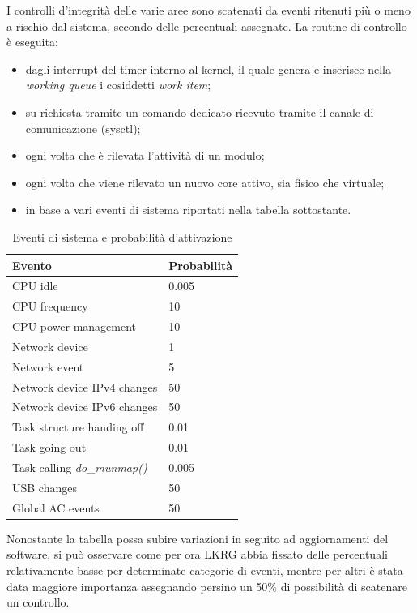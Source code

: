 I controlli d'integrità delle varie aree sono scatenati da eventi ritenuti più o meno a rischio dal sistema, secondo delle percentuali assegnate. La routine di controllo è eseguita:

\begin{itemize}
\item dagli interrupt del timer interno al kernel, il quale genera e inserisce nella \emph{working queue} i cosiddetti \emph{work item};
\item su richiesta tramite un comando dedicato ricevuto tramite il canale di comunicazione (sysctl);
\item ogni volta che è rilevata l'attività di un modulo;
\item ogni volta che viene rilevato un nuovo core attivo, sia fisico che virtuale;
\item in base a vari eventi di sistema riportati nella tabella sottostante.
\end{itemize}

\clearpage

\begin{table}[!htbp]
\label{tab:sysevents}
\centering
\begin{tabular}{|l|l|}
\hline
\textbf{Evento} & \textbf{Probabilità}\\
\hline
CPU idle & 0.005 \\
CPU frequency & 10 \\ 
CPU power management & 10 \\ 
Network device & 1 \\ 
Network event & 5 \\ 
Network device IPv4 changes & 50 \\ 
Network device IPv6 changes & 50 \\
Task structure handing off & 0.01 \\
Task going out & 0.01 \\
Task calling \emph{do\_munmap()} & 0.005 \\ [1ex] 
USB changes & 50 \\ 
Global AC events & 50 \\ 
\hline
\end{tabular}
\caption{Eventi di sistema e probabilità d'attivazione}
\end{table}

Nonostante la tabella possa subire variazioni in seguito ad aggiornamenti del software, si può osservare come per ora LKRG abbia fissato delle percentuali relativamente basse per determinate categorie di eventi, mentre per altri è stata data maggiore importanza assegnando persino un 50\% di possibilità di scatenare un controllo.

